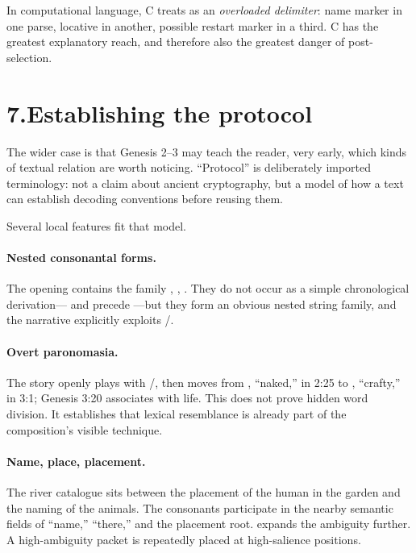 In computational language, C treats  as an \emph{overloaded delimiter}: name marker in one parse, locative in another, possible restart marker in a third. C has the greatest explanatory reach, and therefore also the greatest danger of post-selection.

\section*{7.\quad Establishing the protocol}

The wider case is that Genesis 2--3 may teach the reader, very early, which kinds of textual relation are worth noticing. ``Protocol'' is deliberately imported terminology: not a claim about ancient cryptography, but a model of how a text can establish decoding conventions before reusing them.

Several local features fit that model.

\paragraph{Nested consonantal forms.}
The opening contains the family , , . They do not occur as a simple chronological derivation--- and  precede ---but they form an obvious nested string family, and the narrative explicitly exploits /.

\paragraph{Overt paronomasia.}
The story openly plays with /, then moves from , ``naked,'' in 2:25 to , ``crafty,'' in 3:1; Genesis 3:20 associates  with life.\cite{WaltkeOConnor1990,Westermann1984} This does not prove hidden word division. It establishes that lexical resemblance is already part of the composition's visible technique.

\paragraph{Name, place, placement.}
The river catalogue sits between the placement of the human in the garden and the naming of the animals. The consonants  participate in the nearby semantic fields of ``name,'' ``there,'' and the placement root.  expands the ambiguity further. A high-ambiguity packet is repeatedly placed at high-salience positions.

